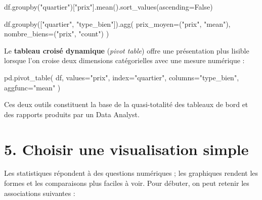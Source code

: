 \documentclass[
  french,
  letterpaper,
  open=any]{scrbook}
\newenvironment{Shaded}{\begin{snugshade}}{\end{snugshade}}
\newcommand{\NormalTok}[1]{\textcolor[rgb]{0.00,0.23,0.31}{#1}}
\newcommand{\OperatorTok}[1]{\textcolor[rgb]{0.37,0.37,0.37}{#1}}
\newcommand{\StringTok}[1]{\textcolor[rgb]{0.13,0.47,0.30}{#1}}
\newcommand{\VariableTok}[1]{\textcolor[rgb]{0.07,0.07,0.07}{#1}}
\theoremstyle{definition}
\theoremstyle{definition}
\theoremstyle{remark}
\begin{document}
\begin{Shaded}
\begin{Highlighting}[]
\NormalTok{df.groupby(}\StringTok{"quartier"}\NormalTok{)[}\StringTok{"prix"}\NormalTok{].mean().sort\_values(ascending}\OperatorTok{=}\VariableTok{False}\NormalTok{)}

\NormalTok{df.groupby([}\StringTok{"quartier"}\NormalTok{, }\StringTok{"type\_bien"}\NormalTok{]).agg(}
\NormalTok{    prix\_moyen}\OperatorTok{=}\NormalTok{(}\StringTok{"prix"}\NormalTok{, }\StringTok{"mean"}\NormalTok{),}
\NormalTok{    nombre\_biens}\OperatorTok{=}\NormalTok{(}\StringTok{"prix"}\NormalTok{, }\StringTok{"count"}\NormalTok{)}
\NormalTok{)}
\end{Highlighting}
\end{Shaded}

Le \textbf{tableau croisé dynamique} (\emph{pivot table}) offre une
présentation plus lisible lorsque l'on croise deux dimensions
catégorielles avec une mesure numérique :

\begin{Shaded}
\begin{Highlighting}[]
\NormalTok{pd.pivot\_table(}
\NormalTok{    df,}
\NormalTok{    values}\OperatorTok{=}\StringTok{"prix"}\NormalTok{,}
\NormalTok{    index}\OperatorTok{=}\StringTok{"quartier"}\NormalTok{,}
\NormalTok{    columns}\OperatorTok{=}\StringTok{"type\_bien"}\NormalTok{,}
\NormalTok{    aggfunc}\OperatorTok{=}\StringTok{"mean"}
\NormalTok{)}
\end{Highlighting}
\end{Shaded}

Ces deux outils constituent la base de la quasi-totalité des tableaux de
bord et des rapports produits par un Data Analyst.

\section{5. Choisir une visualisation
simple}\label{choisir-une-visualisation-simple}

Les statistiques répondent à des questions numériques ; les graphiques
rendent les formes et les comparaisons plus faciles à voir. Pour
débuter, on peut retenir les associations suivantes :
\end{document}
